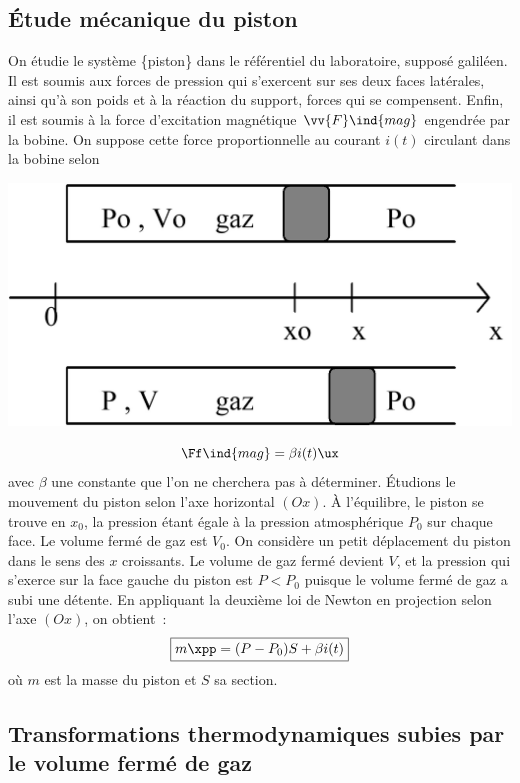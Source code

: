 \documentclass[../main/main.tex]{subfiles}
\begin{document}
{	\subsection{Étude mécanique du piston}
	\noindent
	\begin{minipage}{0.56\linewidth}
		On étudie le système \{piston\} dans le référentiel du laboratoire, supposé
		galiléen. Il est soumis aux forces de pression qui s'exercent sur ses deux
		faces latérales, ainsi qu'à son poids et à la réaction du support, forces
		qui se compensent. Enfin, il est soumis à la force d'excitation magnétique
		$\vv{F}\ind{mag}$ engendrée par la bobine. On suppose cette force
		proportionnelle au courant $i(t)$ circulant dans la bobine selon
	\end{minipage}
	\hfill
	\begin{minipage}{0.40\linewidth}
		\begin{center}
			\includegraphics[width=\linewidth]{gamma2}
		\end{center}
	\end{minipage}
	\[
		\Ff\ind{mag} = \beta i(t) \ux
	\]
	avec $\beta$ une constante que l'on ne cherchera pas à déterminer.
	\bigbreak
	Étudions le mouvement du piston selon l'axe horizontal $(Ox)$. À l'équilibre, le
	piston se trouve en $x_0$, la pression étant égale à la pression atmosphérique
	$P_0$ sur chaque face. Le volume fermé de gaz est $V_0$. On considère un petit
	déplacement du piston dans le sens des $x$ croissants. Le volume de gaz fermé
	devient $V$, et la pression qui s'exerce sur la face gauche du piston est $P <
		P_0$ puisque le volume fermé de gaz a subi une détente. En appliquant la
	deuxième loi de Newton en projection selon l'axe $(Ox)$, on obtient~:
	\[
		\boxed{m\xpp = (P-P_0)S + \beta i(t)}
	\]
	où $m$ est la masse du piston et $S$ sa section.

	\subsection{Transformations thermodynamiques subies par le volume fermé de gaz}

}
\end{document}
